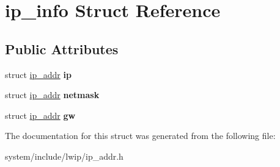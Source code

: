 \hypertarget{structip__info}{}\section{ip\+\_\+info Struct Reference}
\label{structip__info}
\subsection*{Public Attributes}
\begin{DoxyCompactItemize}
\item 
\hypertarget{structip__info_a4936657e519be54caf19352b23846913}{}struct \hyperlink{structip__addr}{ip\+\_\+addr} {\bfseries ip}\label{structip__info_a4936657e519be54caf19352b23846913}

\item 
\hypertarget{structip__info_a3f9e6d30f4ec10eefa7b51653e5c3da4}{}struct \hyperlink{structip__addr}{ip\+\_\+addr} {\bfseries netmask}\label{structip__info_a3f9e6d30f4ec10eefa7b51653e5c3da4}

\item 
\hypertarget{structip__info_a688311148a7415577157c439ee77ee0b}{}struct \hyperlink{structip__addr}{ip\+\_\+addr} {\bfseries gw}\label{structip__info_a688311148a7415577157c439ee77ee0b}

\end{DoxyCompactItemize}


The documentation for this struct was generated from the following file\+:\begin{DoxyCompactItemize}
\item 
system/include/lwip/ip\+\_\+addr.\+h\end{DoxyCompactItemize}
